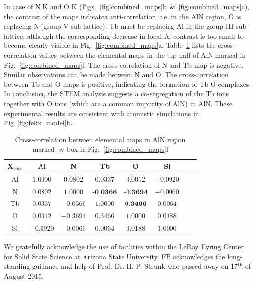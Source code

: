 \documentclass[%
aip,
rsi,%
 amsmath,amssymb,%
 reprint,%
]{revtex4-1}
\begin{document}
In case of N K and O K (Figs.~\ref{fig:combined_maps}b~\&~\ref{fig:combined_maps}c), the contrast of the maps indicates anti-correlation, i.e. in the AlN region, O is replacing N (group V sub-lattice). Tb must be replacing Al in the group III sub-lattice, although the corresponding decrease in local Al contrast is too small to become clearly visible in Fig.~\ref{fig:combined_maps}a. Table~\ref{tab:xcorr} lists the cross-correlation values between the elemental maps in the top half of AlN marked in Fig.~\ref{fig:combined_maps}f. The cross-correlation of N and Tb map is negative. Similar observations can be made between N and O. The cross-correlation between Tb and O maps is positive, indicating the formation of Tb-O complexes. In conclusion, the STEM analysis suggests a co-segregation of the Tb ions together with O ions (which are a common impurity of AlN) in AlN. These experimental results are consistent with atomistic simulations in Fig~\ref{fig:felix_model}b.
\begin{table}[h]
	\caption{Cross-correlation between elemental maps in AlN region marked by box in Fig.~\ref{fig:combined_maps}f}
    \label{tab:xcorr}
    \begin{ruledtabular}
    	\begin{tabular}{cccccccc}
        	X$_{corr}$&Al&N&Tb&O&Si													\\ \hline
            Al& $1.0000$& $0.0802$& $0.0337$& $0.0012$&$-0.0920$					\\
             N& $0.0802$& $1.0000$& $\textbf{-0.0366}$&$\textbf{-0.3694}$&$-0.0060$	\\
            Tb& $0.0337$&$-0.0366$& $1.0000$& $\textbf{0.3466}$&$0.0064$			\\
             O& $0.0012$&$-0.3694$&	$0.3466$& $1.0000$&$0.0188$						\\
            Si&$-0.0920$&$-0.0060$&$0.0064$&$0.0188$& $1.0000$
    	\end{tabular}
    \end{ruledtabular}
\end{table}

\begin{acknowledgments}
We gratefully acknowledge the use of facilities within the LeRoy Eyring Center for Solid State Science at Arizona State University. FB acknowledges the long-standing guidance and help of Prof. Dr. H. P. Strunk who passed away on 17$^\text{th}$ of August 2015.
\end{acknowledgments}

\end{document}
